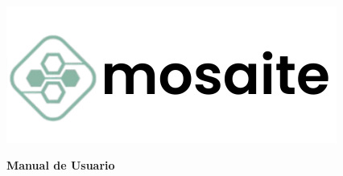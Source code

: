 \begin{titlepage}
    \centering
    \textcolor{white}{---}
    \vspace{5cm}

    \includegraphics[width=\textwidth]{img/logo.png}

    \vspace{3cm}
    {\Huge \bfseries Manual de Usuario\par}
    \vfill
\end{titlepage}
